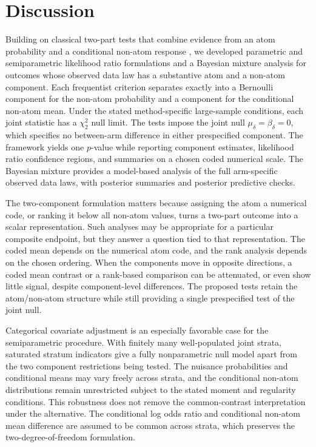 \documentclass[11pt]{article}
\begin{document}
\section{Discussion}\label{sec:discussion}

Building on classical two-part tests that combine evidence from an atom probability and a conditional non-atom response \citep{lachenbruch1976clumping,lachenbruch2001comparisons,lachenbruch2002excess}, we developed parametric and semiparametric likelihood ratio formulations and a Bayesian mixture analysis for outcomes whose observed data law has a substantive atom and a non-atom component. Each frequentist criterion separates exactly into a Bernoulli component for the non-atom probability and a component for the conditional non-atom mean. Under the stated method-specific large-sample conditions, each joint statistic has a $\chi^2_2$ null limit. The tests impose the joint null $\mu_\delta=\beta_\delta=0$, which specifies no between-arm difference in either prespecified component. The framework yields one $p$-value while reporting component estimates, likelihood ratio confidence regions, and summaries on a chosen coded numerical scale. The Bayesian mixture provides a model-based analysis of the full arm-specific observed data laws, with posterior summaries and posterior predictive checks.

The two-component formulation matters because assigning the atom a numerical code, or ranking it below all non-atom values, turns a two-part outcome into a scalar representation. Such analyses may be appropriate for a particular composite endpoint, but they answer a question tied to that representation. The coded mean depends on the numerical atom code, and the rank analysis depends on the chosen ordering. When the components move in opposite directions, a coded mean contrast or a rank-based comparison can be attenuated, or even show little signal, despite component-level differences. The proposed tests retain the atom/non-atom structure while still providing a single prespecified test of the joint null.

Categorical covariate adjustment is an especially favorable case for the semiparametric procedure. With finitely many well-populated joint strata, saturated stratum indicators give a fully nonparametric null model apart from the two component restrictions being tested. The nuisance probabilities and conditional means may vary freely across strata, and the conditional non-atom distributions remain unrestricted subject to the stated moment and regularity conditions. This robustness does not remove the common-contrast interpretation under the alternative. The conditional log odds ratio and conditional non-atom mean difference are assumed to be common across strata, which preserves the two-degree-of-freedom formulation.
\end{document}
